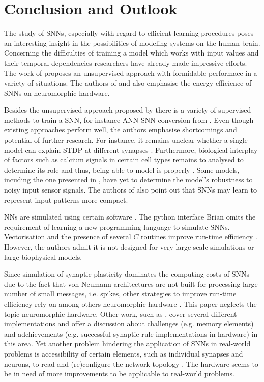\section{Conclusion and Outlook}
\label{sec:conclusion}

The study of \acp{SNN}, especially with regard to efficient learning procedures poses an interesting insight in the possibilities of modeling
systems on the human brain.
Concerning the difficulties of training a model which works with input values and their temporal dependencies researchers have already made 
impressive efforts.
The work of \cite{SNN} proposes an unsupervised approach with formidable performace in a variety of situations.
The authors of \cite{SNN} and \cite{Synaptic_plasticity} also emphasise the energy efficience of \acp{SNN} on neuromorphic hardware.

Besides the unsupervised approach proposed by \cite{SNN} there is a variety of supervised methods to train a \ac{SNN}, 
for instance \ac{ANN}-\ac{SNN} conversion from \cite{DIET_SNN}.
Even though existing approaches perform well, the authors emphasise shortcomings and potential of further research.
For instance, it remains unclear whether a single model can explain \ac{STDP} at different synapses \cite{STDP_hebbian}.
Furthermore, biological interplay of factors such as calcium signals in certain cell types remains to analysed to determine its role and thus, being able to model is properly \cite{STDP_hebbian}.
Some models, incuding the one presented in \cite{object_detection_SNN}, have yet to determine the model's robustness to noisy input sensor signals.
The authors of \cite{object_detection_SNN} also point out that \acp{SNN} may learn to represent input patterns more compact.

\Acp{NN} are simulated using certain software \cite{simulation_Brian}.
The python interface Brian omits the requirement of learning a new programming language to simulate \acp{SNN}.
Vectorisation and the presence of several $C$ routines improve run-time efficiency \cite{simulation_Brian}.
However, the authors admit it is not designed for very large scale simulations or large biophysical models.

Since simulation of synaptic plasticity dominates the computing costs of \acp{SNN} due to the fact that von Neumann architectures are not built for processing large number of small messages, i.e. spikes, 
other strategies to improve run-time efficiency rely on among others neuromorphic hardware \cite{simulation_STDP}.
This paper neglects the topic neuromorphic hardware.
Other work, such as \cite{Synaptic_plasticity}, 
cover several different implementations and offer a discussion about challenges (e.g. memory elements) and adchievements 
(e.g. successful synaptic rule implementations in hardware) in this area.
Yet another problem hindering the application of \acp{SNN} in real-world problems is accessibility of certain elements, such as individual synapses and neurons, 
to read and (re)configure the network topology \cite{hardware_STDP}.
The hardware seems to be in need of more improvements to be applicable to real-world problems.